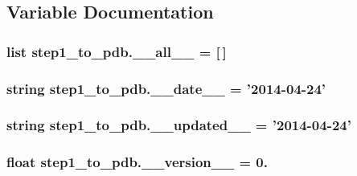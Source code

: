 \subsection{Variable Documentation}
\hypertarget{namespacestep1__to__pdb_aa69f205778c96b32ee4b45262a0338aa}{
\subsubsection[{\-\_\-\-\_\-all\-\_\-\-\_\-}]{\setlength{\rightskip}{0pt plus 5cm}list step1\-\_\-to\-\_\-pdb.\-\_\-\-\_\-all\-\_\-\-\_\- = \mbox{[}$\,$\mbox{]}}}\label{namespacestep1__to__pdb_aa69f205778c96b32ee4b45262a0338aa}
\hypertarget{namespacestep1__to__pdb_a263cac53fc78edd6c1ed8cc2d8d1d32b}{
\subsubsection[{\-\_\-\-\_\-date\-\_\-\-\_\-}]{\setlength{\rightskip}{0pt plus 5cm}string step1\-\_\-to\-\_\-pdb.\-\_\-\-\_\-date\-\_\-\-\_\- = '2014-\/04-\/24'}}\label{namespacestep1__to__pdb_a263cac53fc78edd6c1ed8cc2d8d1d32b}
\hypertarget{namespacestep1__to__pdb_aa056e75d63fd41d9d4c342ac7e7dfa39}{
\subsubsection[{\-\_\-\-\_\-updated\-\_\-\-\_\-}]{\setlength{\rightskip}{0pt plus 5cm}string step1\-\_\-to\-\_\-pdb.\-\_\-\-\_\-updated\-\_\-\-\_\- = '2014-\/04-\/24'}}\label{namespacestep1__to__pdb_aa056e75d63fd41d9d4c342ac7e7dfa39}
\hypertarget{namespacestep1__to__pdb_a0e0c70e8561ad65054fcce206822b1c8}{
\subsubsection[{\-\_\-\-\_\-version\-\_\-\-\_\-}]{\setlength{\rightskip}{0pt plus 5cm}float step1\-\_\-to\-\_\-pdb.\-\_\-\-\_\-version\-\_\-\-\_\- = 0.}}\label{namespacestep1__to__pdb_a0e0c70e8561ad65054fcce206822b1c8}
